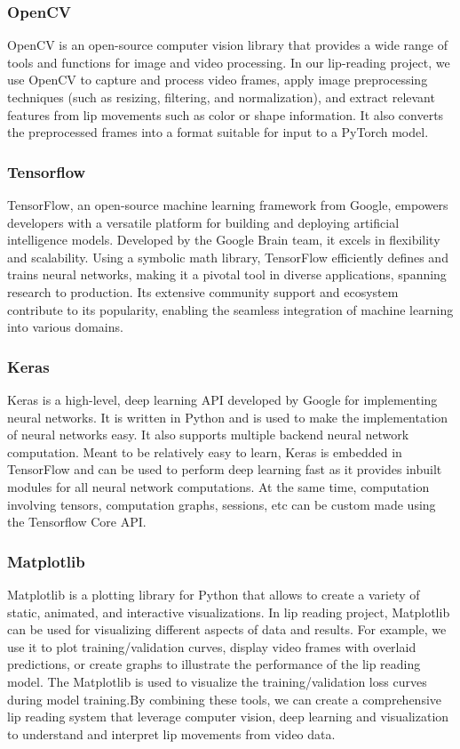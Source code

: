 \subsubsection{OpenCV}
OpenCV is an open-source computer vision library that provides a wide range of tools and functions for image and video processing. In our lip-reading project, we use OpenCV to capture and process video frames, apply image preprocessing techniques (such as resizing, filtering, and normalization), and extract relevant features from lip movements such as color or shape information. It also converts the preprocessed frames into a format suitable for input to a PyTorch model.
\newpage
\subsubsection{Tensorflow}
TensorFlow, an open-source machine learning framework from Google, empowers developers with a versatile platform for building and deploying artificial intelligence models. Developed by the Google Brain team, it excels in flexibility and scalability. Using a symbolic math library, TensorFlow efficiently defines and trains neural networks, making it a pivotal tool in diverse applications, spanning research to production. Its extensive community support and ecosystem contribute to its popularity, enabling the seamless integration of machine learning into various domains.

\subsubsection{Keras}
Keras is a high-level, deep learning API developed by Google for implementing neural networks. It is written in Python and is used to make the implementation of neural networks easy. It also supports multiple backend neural network computation. Meant to be relatively easy to learn, Keras is embedded in TensorFlow and can be used to perform deep learning fast as it provides inbuilt modules for all neural network computations. At the same time, computation involving tensors, computation graphs, sessions, etc can be custom made using the Tensorflow Core API.

\subsubsection{Matplotlib}
Matplotlib is a plotting library for Python that allows  to create a variety of static, animated, and interactive visualizations. In  lip reading project, Matplotlib can be used for visualizing different aspects of  data and results. For example, we use it to plot training/validation curves, display video frames with overlaid predictions, or create graphs to illustrate the performance of the lip reading model. The Matplotlib is used to visualize the training/validation loss curves during model training.By combining these tools, we can create a comprehensive lip reading system that leverage computer vision, deep learning and visualization to understand and interpret lip movements from video data.
